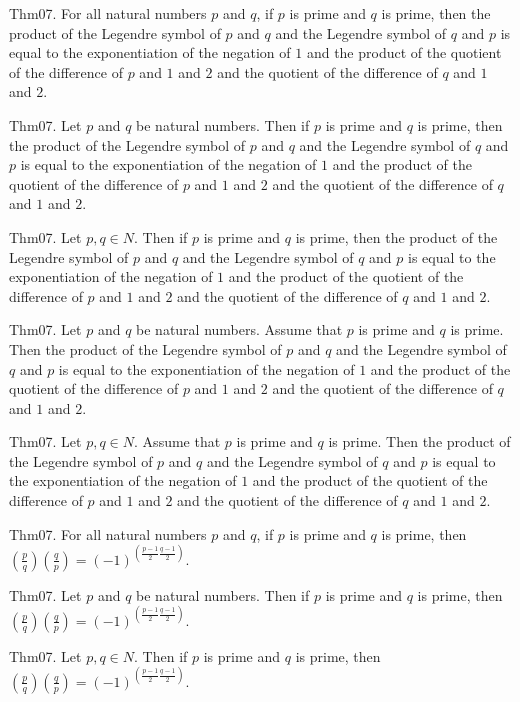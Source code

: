 \documentclass{article}
\begin{document}
Thm07. For all natural numbers $p$ and $q$, if $p$ is prime and $q$ is prime, then the product of the Legendre symbol of $p$ and $q$ and the Legendre symbol of $q$ and $p$ is equal to the exponentiation of the negation of $1$ and the product of the quotient of the difference of $p$ and $1$ and $2$ and the quotient of the difference of $q$ and $1$ and $2$.

Thm07. Let $p$ and $q$ be natural numbers. Then if $p$ is prime and $q$ is prime, then the product of the Legendre symbol of $p$ and $q$ and the Legendre symbol of $q$ and $p$ is equal to the exponentiation of the negation of $1$ and the product of the quotient of the difference of $p$ and $1$ and $2$ and the quotient of the difference of $q$ and $1$ and $2$.

Thm07. Let $p , q \in N$. Then if $p$ is prime and $q$ is prime, then the product of the Legendre symbol of $p$ and $q$ and the Legendre symbol of $q$ and $p$ is equal to the exponentiation of the negation of $1$ and the product of the quotient of the difference of $p$ and $1$ and $2$ and the quotient of the difference of $q$ and $1$ and $2$.

Thm07. Let $p$ and $q$ be natural numbers. Assume that $p$ is prime and $q$ is prime. Then the product of the Legendre symbol of $p$ and $q$ and the Legendre symbol of $q$ and $p$ is equal to the exponentiation of the negation of $1$ and the product of the quotient of the difference of $p$ and $1$ and $2$ and the quotient of the difference of $q$ and $1$ and $2$.

Thm07. Let $p , q \in N$. Assume that $p$ is prime and $q$ is prime. Then the product of the Legendre symbol of $p$ and $q$ and the Legendre symbol of $q$ and $p$ is equal to the exponentiation of the negation of $1$ and the product of the quotient of the difference of $p$ and $1$ and $2$ and the quotient of the difference of $q$ and $1$ and $2$.

Thm07. For all natural numbers $p$ and $q$, if $p$ is prime and $q$ is prime, then $\left(\frac{ p }{ q }\right) \left(\frac{ q }{ p }\right) = {(- 1)}^{ (\frac{ p - 1 }{ 2}\frac{ q - 1 }{ 2})}$.

Thm07. Let $p$ and $q$ be natural numbers. Then if $p$ is prime and $q$ is prime, then $\left(\frac{ p }{ q }\right) \left(\frac{ q }{ p }\right) = {(- 1)}^{ (\frac{ p - 1 }{ 2}\frac{ q - 1 }{ 2})}$.

Thm07. Let $p , q \in N$. Then if $p$ is prime and $q$ is prime, then $\left(\frac{ p }{ q }\right) \left(\frac{ q }{ p }\right) = {(- 1)}^{ (\frac{ p - 1 }{ 2}\frac{ q - 1 }{ 2})}$.
\end{document}
